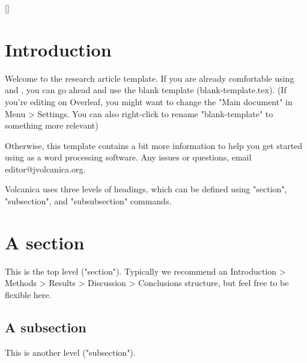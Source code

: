 \documentclass[draft, {\secondLanguage}, english]{volcanica-template}
\author[{{\affiliation{1}}}] 				%
{\orcidaffil{0000.0000.0000.0000}~			%
Person A. G. Persondóttir	 				%
\Email{email@address.io}} 		        	%
\author[{{\affiliation{2}}}] 				%
{\orcidaffil{0000.0000.0000.0000}~			%
Someone Else} 					        	%
\author[{{\affiliation{3}}}] 				%
{\orcidaffil{0000.0000.0000.0000}~			%
Another S. Cientist}						%
\affil[{{\affiliation{1}}}]{					%
The first affiliation.
}
\affil[{{\affiliation{2}}}]{					%
A second affiliation; note how it ends in a full stop.
}
\affil[{{\affiliation{3}}}]{					%
Somewhere else.}
\begin{document}
\FrontMatter{\protect{\lipsum[45]}}
[]%
{					
}

\hypertarget{introduction}{%
\section{Introduction}\label{introduction}}		%

Welcome to the \VOLCANICA research article \latex template. If you are already comfortable using \latex and \bibtex, you can go ahead and use the blank template (blank-template.tex). (If you're editing on Overleaf, you might want to change the "Main document" in Menu > Settings. You can also right-click to rename "blank-template" to something more relevant)

Otherwise, this template contains a bit more information to help you get started using \latex as a word processing software. Any issues or questions, email editor@jvolcanica.org.

Volcanica uses three levels of headings, which can be defined using "section", "subsection", and "subsubsection" commands.

\section{A section}\label{sec:02}
This is the top level ("section"). Typically we recommend an Introduction > Methods > Results > Discussion > Conclusions structure, but feel free to be flexible here.

\subsection{A subsection}\label{sec:02a}
This is another level ("subsection").
\end{document}
